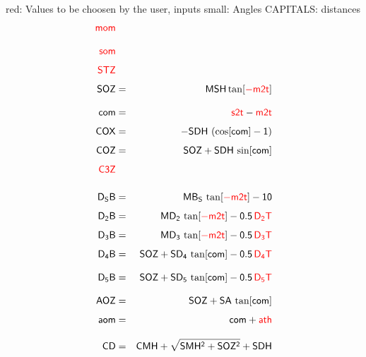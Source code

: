 \documentclass[12]{article}
\newcommand{\cor}[1]{{\color{red}#1}}
\begin{document}
\cor{red}: Values to be choosen by the user, inputs \hfill
\textsf{small}: Angles \hfill
\textsf{CAPITALS}: distances
\begin{eqnarray}
 \sf \cor{mom} & & \\[2ex]
 \sf \cor{som} & & \\[1ex]
 \sf \cor{STZ} & & \\[1ex]
 \sf SOZ  &=&\sf  MSH \tan[ \cor{-m2t} ] \\[2ex]
 \sf com  &=&\sf  \cor{s2t} - \cor{m2t} \\[1ex]
 \sf COX  &=&\sf  - SDH \, \left( \cos[ com ] - 1 \right) \\[1ex]
 \sf COZ  &=&\sf  SOZ + SDH \, \sin[ com ] \\[1ex]
 \sf \cor{C3Z} & & \\[3ex]
 \sf D_SB &=&\sf  MB_S \, \tan[ \cor{-m2t} ] - 10 \\[1ex]
 \sf D_2B &=&\sf  MD_2 \, \tan[ \cor{-m2t} ] - 0.5 \, \cor{D_2T} \\[1ex]
 \sf D_3B &=&\sf  MD_3 \, \tan[ \cor{-m2t} ] - 0.5 \, \cor{D_3T} \\[1ex]
 \sf D_4B &=&\sf  SOZ + SD_4 \, \tan[ com ] - 0.5 \, \cor{D_4T} \\[2ex]
 \sf D_5B &=&\sf  SOZ + SD_5 \, \tan[ com ] - 0.5 \, \cor{D_5T} \\[2ex]
 \sf AOZ  &=&\sf  SOZ + SA \, \tan[ com ] \\[1ex]
 \sf aom  &=&\sf  com + \cor{ath} \\[2ex]
 \sf CD   &=&\sf  CMH + \sqrt{SMH^2 + SOZ^2} + SDH    
\end{eqnarray}
\end{document}

